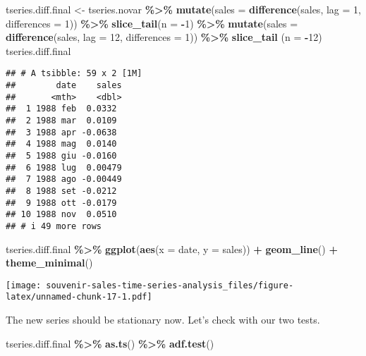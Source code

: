 \documentclass[
]{article}
\newenvironment{Shaded}{\begin{snugshade}}{\end{snugshade}}
\newcommand{\AttributeTok}[1]{\textcolor[rgb]{0.13,0.29,0.53}{#1}}
\newcommand{\DecValTok}[1]{\textcolor[rgb]{0.00,0.00,0.81}{#1}}
\newcommand{\FunctionTok}[1]{\textcolor[rgb]{0.13,0.29,0.53}{\textbf{#1}}}
\newcommand{\NormalTok}[1]{#1}
\newcommand{\OtherTok}[1]{\textcolor[rgb]{0.56,0.35,0.01}{#1}}
\newcommand{\SpecialCharTok}[1]{\textcolor[rgb]{0.81,0.36,0.00}{\textbf{#1}}}
\begin{document}
\begin{Shaded}
\begin{Highlighting}[]
\NormalTok{tseries.diff.final }\OtherTok{\textless{}{-}}\NormalTok{ tseries.novar }\SpecialCharTok{\%\textgreater{}\%}
  \FunctionTok{mutate}\NormalTok{(}\AttributeTok{sales =} \FunctionTok{difference}\NormalTok{(sales, }\AttributeTok{lag =} \DecValTok{1}\NormalTok{, }\AttributeTok{differences =} \DecValTok{1}\NormalTok{)) }\SpecialCharTok{\%\textgreater{}\%}
  \FunctionTok{slice\_tail}\NormalTok{(}\AttributeTok{n =} \SpecialCharTok{{-}}\DecValTok{1}\NormalTok{) }\SpecialCharTok{\%\textgreater{}\%}
  \FunctionTok{mutate}\NormalTok{(}\AttributeTok{sales =} \FunctionTok{difference}\NormalTok{(sales, }\AttributeTok{lag =} \DecValTok{12}\NormalTok{, }\AttributeTok{differences =} \DecValTok{1}\NormalTok{)) }\SpecialCharTok{\%\textgreater{}\%}
  \FunctionTok{slice\_tail}\NormalTok{ (}\AttributeTok{n =} \SpecialCharTok{{-}}\DecValTok{12}\NormalTok{)}
\NormalTok{tseries.diff.final}
\end{Highlighting}
\end{Shaded}

\begin{verbatim}
## # A tsibble: 59 x 2 [1M]
##        date    sales
##       <mth>    <dbl>
##  1 1988 feb  0.0332 
##  2 1988 mar  0.0109 
##  3 1988 apr -0.0638 
##  4 1988 mag  0.0140 
##  5 1988 giu -0.0160 
##  6 1988 lug  0.00479
##  7 1988 ago -0.00449
##  8 1988 set -0.0212 
##  9 1988 ott -0.0179 
## 10 1988 nov  0.0510 
## # i 49 more rows
\end{verbatim}

\begin{Shaded}
\begin{Highlighting}[]
\NormalTok{tseries.diff.final }\SpecialCharTok{\%\textgreater{}\%}
  \FunctionTok{ggplot}\NormalTok{(}\FunctionTok{aes}\NormalTok{(}\AttributeTok{x =}\NormalTok{ date, }\AttributeTok{y =}\NormalTok{ sales)) }\SpecialCharTok{+}
  \FunctionTok{geom\_line}\NormalTok{() }\SpecialCharTok{+}
  \FunctionTok{theme\_minimal}\NormalTok{()}
\end{Highlighting}
\end{Shaded}

\texttt{[image: souvenir-sales-time-series-analysis\_files/figure-latex/unnamed-chunk-17-1.pdf]}

The new series should be stationary now. Let's check with our two tests.

\begin{Shaded}
\begin{Highlighting}[]
\NormalTok{tseries.diff.final }\SpecialCharTok{\%\textgreater{}\%} \FunctionTok{as.ts}\NormalTok{() }\SpecialCharTok{\%\textgreater{}\%} \FunctionTok{adf.test}\NormalTok{()}
\end{Highlighting}
\end{Shaded}
\end{document}
